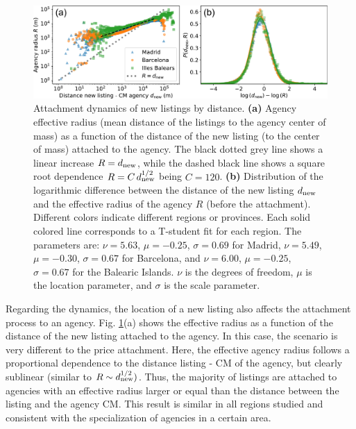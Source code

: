 \begin{figure}
    \centering
    \includegraphics[width =\textwidth]{Figs/Idealista_dynamics/distance_attach.pdf}
	\caption[Attachment dynamics of new listings by distance.]{ Attachment dynamics of new listings by distance. \textbf{(a)} Agency effective radius (mean distance of the listings to the agency center of mass) as a function of the distance of the new listing (to the center of mass) attached to the agency. The black dotted grey line shows a linear increase $R = d_{\rm new}$, while the dashed black line shows a square root dependence $R = C \, d_{\rm new}^{1/2}$ being $C = 120$. \textbf{(b)} Distribution of the logarithmic difference between the distance of the new listing $d_{\rm new}$ and the effective radius of the agency $R$ (before the attachment). Different colors indicate different regions or provinces. Each solid colored line corresponds to a T-student fit for each region.  The parameters are: $\nu = 5.63$, $\mu = -0.25$, $\sigma = 0.69$ for Madrid, $\nu = 5.49$, $\mu = -0.30$, $\sigma = 0.67$ for Barcelona, and $\nu = 6.00$, $\mu = -0.25$, $\sigma = 0.67$ for the Balearic Islands. $\nu$ is the degrees of freedom, $\mu$ is the location parameter, and $\sigma$ is the scale parameter. \label{fig:distance_attach}}
\end{figure}

Regarding the dynamics, the location of a new listing also affects the attachment process to an agency. Fig. \ref{fig:distance_attach}(a) shows the effective radius as a function of the distance of the new listing attached to the agency. In this case, the scenario is very different to the price attachment. Here, the effective agency radius follows a proportional dependence to the distance listing - CM of the agency, but clearly sublinear (similar to $R \sim d_{\rm new}^{1/2})$. Thus, the majority of listings are attached to agencies with an effective radius larger or equal than the distance between the listing and the agency CM. This result is similar in all regions studied and consistent with the specialization of agencies in a certain area.


